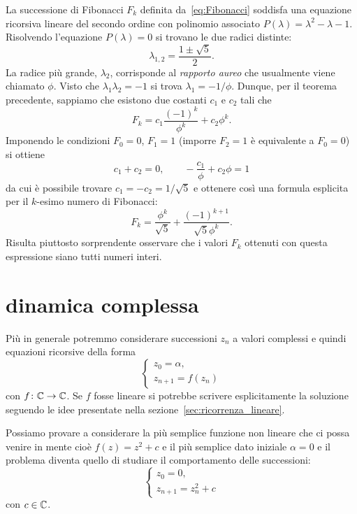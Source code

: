 \begin{example}
%
%
La successione di Fibonacci $F_k$ definita da~\eqref{eq:Fibonacci}
soddisfa una equazione ricorsiva lineare del secondo ordine con polinomio associato
$P(\lambda) = \lambda^2 - \lambda - 1$. Risolvendo l'equazione $P(\lambda)=0$
si trovano le due radici distinte:
\[
  \lambda_{1,2} = \frac{1 \pm \sqrt{5}}{2}.
\]
La radice più grande, $\lambda_2$, corrisponde al
\emph{rapporto aureo}%
 che usualmente viene chiamato $\phi$.
\index{$\phi$}%
Visto che $\lambda_1 \lambda_2 = -1$ si trova $\lambda_1 = -1/\phi$.
Dunque, per il teorema precedente, sappiamo che esistono due costanti $c_1$ e
$c_2$ tali che
\[
  F_k = c_1 \frac{(-1)^k}{\phi^k} + c_2 \phi^k .
\]
Imponendo le condizioni $F_0=0$, $F_1=1$ (imporre $F_2 = 1$ è equivalente a $F_0=0$)
si ottiene
\[
  c_1 + c_2 = 0, \qquad - \frac{c_1}{\phi} + c_2 \phi  = 1
\]
da cui è possibile trovare $c_1 = - c_2 = 1/\sqrt{5}$ e ottenere
così
una formula esplicita per il $k$-esimo numero di Fibonacci:
\[
  F_k = \frac{\phi^k}{\sqrt 5} + \frac{(-1)^{k+1}}{\sqrt 5\phi^k}.
\]
Risulta piuttosto sorprendente osservare che i valori $F_k$ ottenuti
con questa espressione siano tutti numeri interi.
\end{example}

\section{dinamica complessa}
\label{sec:mandelbrot}

Più in generale potremmo considerare successioni $z_n$ a valori complessi
e quindi equazioni ricorsive della forma
\[
  \begin{cases}
    z_0 = \alpha, \\
    z_{n+1} = f(z_n)
  \end{cases}
\]
con $f\colon {\mathbb C} \to {\mathbb C}$.
Se $f$ fosse lineare si potrebbe scrivere esplicitamente la soluzione
seguendo le idee presentate nella sezione~\ref{sec:ricorrenza_lineare}.

Possiamo provare a considerare la più semplice funzione non lineare che ci possa
venire in mente cioè $f(z) = z^2 + c$ e il più semplice dato iniziale $\alpha = 0$
e il problema diventa quello di studiare il comportamento delle successioni:
\begin{equation}\label{eq:mandelbrot}
  \begin{cases}
    z_0 = 0, \\
    z_{n+1} = z_n^2 + c
  \end{cases}
\end{equation}
con $c\in {\mathbb C}$.

